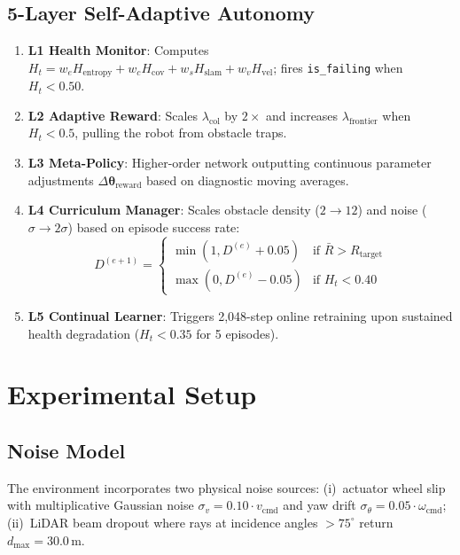 \documentclass[conference]{IEEEtran}
\begin{document}
\subsection{5-Layer Self-Adaptive Autonomy}
\begin{enumerate}
    \item \textbf{L1 Health Monitor}: Computes $H_t = w_e H_{\text{entropy}} + w_c H_{\text{cov}} + w_s H_{\text{slam}} + w_v H_{\text{vel}}$; fires \texttt{is\_failing} when $H_t < 0.50$.
    \item \textbf{L2 Adaptive Reward}: Scales $\lambda_{\text{col}}$ by $2\times$ and increases $\lambda_{\text{frontier}}$ when $H_t < 0.5$, pulling the robot from obstacle traps.
    \item \textbf{L3 Meta-Policy}: Higher-order network outputting continuous parameter adjustments $\Delta\boldsymbol{\theta}_{\text{reward}}$ based on diagnostic moving averages.
    \item \textbf{L4 Curriculum Manager}: Scales obstacle density ($2 \to 12$) and noise ($\sigma \to 2\sigma$) based on episode success rate:
    \begin{equation}
    D^{(e+1)} = \begin{cases}
    \min(1, D^{(e)}\!+\!0.05) & \text{if } \bar{R} > R_{\text{target}} \\
    \max(0, D^{(e)}\!-\!0.05) & \text{if } H_t < 0.40
    \end{cases}
    \end{equation}
    \item \textbf{L5 Continual Learner}: Triggers 2{,}048-step online retraining upon sustained health degradation ($H_t < 0.35$ for 5 episodes).
\end{enumerate}

\section{Experimental Setup}

\subsection{Noise Model}
The environment incorporates two physical noise sources: (i)~actuator wheel slip with multiplicative Gaussian noise $\sigma_v = 0.10 \cdot v_{\text{cmd}}$ and yaw drift $\sigma_\theta = 0.05 \cdot \omega_{\text{cmd}}$; (ii)~LiDAR beam dropout where rays at incidence angles $>75^\circ$ return $d_{\max} = 30.0$\,m.
\end{document}
